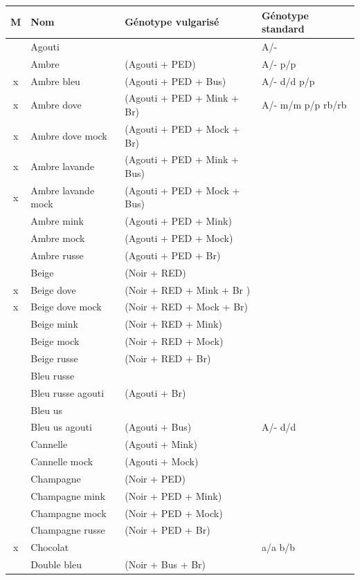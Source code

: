 ﻿\documentclass[a4paper,10pt]{article}
\begin{document}
\begin{longtable}{|c|l|l|l|}\hline
\textbf{M} & \textbf{Nom} & \textbf{Génotype vulgarisé} & \textbf{Génotype standard} \\\hline
\endhead
& Agouti & & A/- \\\hline
& Ambre & (Agouti + PED) & A/- p/p \\\hline
x & Ambre bleu  & (Agouti + PED + Bus) & A/- d/d p/p \\\hline
x & Ambre dove & (Agouti + PED + Mink + Br) & A/- m/m p/p rb/rb \\\hline
x & Ambre dove mock  & (Agouti + PED + Mock + Br) & \\\hline
x & Ambre lavande & (Agouti + PED + Mink + Bus) & \\\hline
x & Ambre lavande mock & (Agouti + PED + Mock   + Bus) & \\\hline
& Ambre mink &  (Agouti + PED + Mink) & \\\hline
& Ambre mock & (Agouti + PED + Mock) & \\\hline
& Ambre russe & (Agouti + PED + Br) & \\\hline
& Beige & (Noir + RED) & \\\hline
x & Beige dove & (Noir   + RED + Mink + Br )  & \\\hline
x & Beige dove mock  & (Noir + RED + Mock + Br) & \\\hline
& Beige mink  & (Noir   + RED + Mink) & \\\hline
& Beige mock  & (Noir + RED + Mock) & \\\hline
& Beige russe  & (Noir + RED + Br) & \\\hline
& Bleu russe & & \\\hline
& Bleu russe agouti  & (Agouti + Br) & \\\hline
& Bleu us & & \\\hline
& Bleu us agouti  & (Agouti + Bus) &  A/- d/d\\\hline
& Cannelle  & (Agouti + Mink) & \\\hline
& Cannelle mock  & (Agouti + Mock) & \\\hline
& Champagne  & (Noir + PED) & \\\hline
& Champagne mink  & (Noir + PED + Mink) & \\\hline
& Champagne mock  & (Noir + PED + Mock) & \\\hline
& Champagne russe  & (Noir + PED + Br) & \\\hline
x & Chocolat & & a/a b/b\\\hline
& Double bleu  & (Noir + Bus + Br) & \\\hline

\end{longtable}
\end{document}
